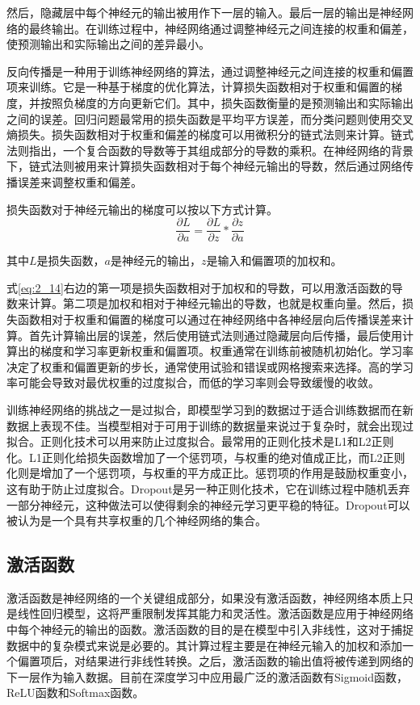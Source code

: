 然后，隐藏层中每个神经元的输出被用作下一层的输入。最后一层的输出是神经网络的最终输出。在训练过程中，神经网络通过调整神经元之间连接的权重和偏差，使预测输出和实际输出之间的差异最小。

反向传播是一种用于训练神经网络的算法，通过调整神经元之间连接的权重和偏置项来训练。它是一种基于梯度的优化算法，计算损失函数相对于权重和偏置的梯度，并按照负梯度的方向更新它们。其中，损失函数衡量的是预测输出和实际输出之间的误差。回归问题最常用的损失函数是平均平方误差，而分类问题则使用交叉熵损失。损失函数相对于权重和偏差的梯度可以用微积分的链式法则来计算。链式法则指出，一个复合函数的导数等于其组成部分的导数的乘积。在神经网络的背景下，链式法则被用来计算损失函数相对于每个神经元输出的导数，然后通过网络传播误差来调整权重和偏差。

损失函数对于神经元输出的梯度可以按以下方式计算。
\begin{equation}
\label{eq:2_14}
\frac{\partial L}{\partial a} = \frac{\partial L}{\partial z} * \frac{\partial z}{\partial a}
\end{equation}


其中$L$是损失函数，$a$是神经元的输出，$z$是输入和偏置项的加权和。

式\ref{eq:2_14}右边的第一项是损失函数相对于加权和的导数，可以用激活函数的导数来计算。第二项是加权和相对于神经元输出的导数，也就是权重向量。然后，损失函数相对于权重和偏置的梯度可以通过在神经网络中各神经层向后传播误差来计算。首先计算输出层的误差，然后使用链式法则通过隐藏层向后传播，最后使用计算出的梯度和学习率更新权重和偏置项。权重通常在训练前被随机初始化。学习率决定了权重和偏置更新的步长，通常使用试验和错误或网格搜索来选择。高的学习率可能会导致对最优权重的过度拟合，而低的学习率则会导致缓慢的收敛。

训练神经网络的挑战之一是过拟合，即模型学习到的数据过于适合训练数据而在新数据上表现不佳。当模型相对于可用于训练的数据量来说过于复杂时，就会出现过拟合。正则化技术可以用来防止过度拟合。最常用的正则化技术是L1和L2正则化。L1正则化给损失函数增加了一个惩罚项，与权重的绝对值成正比，而L2正则化则是增加了一个惩罚项，与权重的平方成正比。惩罚项的作用是鼓励权重变小，这有助于防止过度拟合。Dropout是另一种正则化技术，它在训练过程中随机丢弃一部分神经元，这种做法可以使得剩余的神经元学习更平稳的特征。Dropout可以被认为是一个具有共享权重的几个神经网络的集合。


\subsection{激活函数}

激活函数是神经网络的一个关键组成部分，如果没有激活函数，神经网络本质上只是线性回归模型，这将严重限制发挥其能力和灵活性。激活函数是应用于神经网络中每个神经元的输出的函数。激活函数的目的是在模型中引入非线性，这对于捕捉数据中的复杂模式来说是必要的。其计算过程主要是在神经元输入的加权和添加一个偏置项后，对结果进行非线性转换。之后，激活函数的输出值将被传递到网络的下一层作为输入数据。目前在深度学习中应用最广泛的激活函数有Sigmoid函数，ReLU函数和Softmax函数。

